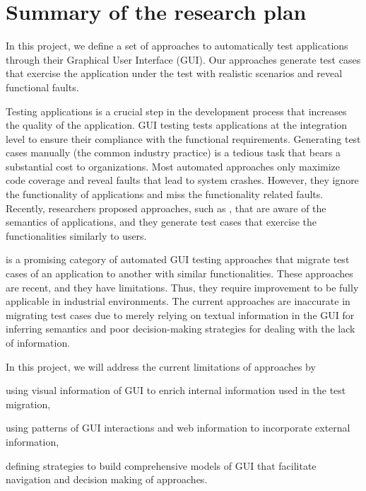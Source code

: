 	\section{Summary of the research plan}


In this project, we define a set of approaches to automatically test applications through their Graphical User Interface (GUI). 
Our approaches generate test cases that exercise the application under the test with realistic scenarios and reveal functional faults. 


Testing applications is a crucial step in the development process that increases the quality of the application.
GUI testing tests applications at the integration level to ensure their compliance with the functional requirements. 
Generating test cases manually (the common industry practice) is a tedious task that bears a substantial cost to organizations. Most automated approaches only maximize code coverage and reveal faults that lead to system crashes.
However, they ignore the functionality of applications and miss the functionality related faults. 
Recently, researchers proposed approaches, such as \testreuse, that are aware of the semantics of applications, and they generate test cases that exercise the functionalities similarly to users. 


\testreuse is a promising category of automated GUI testing approaches that migrate test cases of an application to another with similar functionalities. These approaches are recent, and they have limitations. 
Thus, they require improvement to be fully applicable in industrial environments. The current \testreuse approaches are inaccurate in migrating test cases due to merely relying on textual information in the GUI for inferring semantics and poor decision-making strategies for dealing with the lack of information. 


In this project, we will address the current limitations of \testreuse approaches by
\begin{inparaenum}[(i)]
\item using visual information of GUI to enrich internal information used in the test migration,
\item using patterns of GUI interactions and web information to incorporate external information,
\item defining strategies to build comprehensive models of GUI that facilitate navigation and decision making of \testreuse approaches.
\end{inparaenum}

